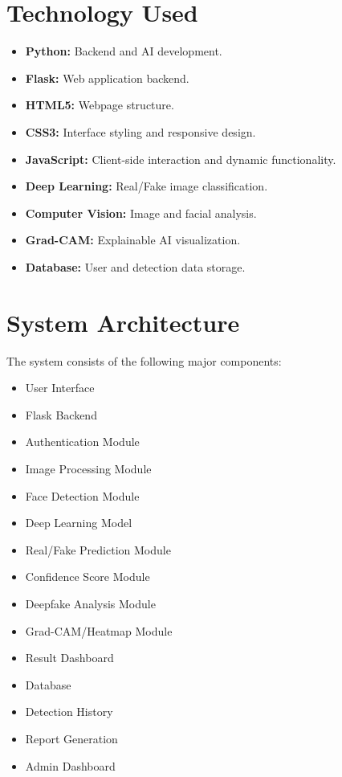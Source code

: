 \documentclass[12pt,a4paper,oneside]{report}
\begin{document}
\section{Technology Used}

\begin{itemize}
    \item \textbf{Python:} Backend and AI development.
    \item \textbf{Flask:} Web application backend.
    \item \textbf{HTML5:} Webpage structure.
    \item \textbf{CSS3:} Interface styling and responsive design.
    \item \textbf{JavaScript:} Client-side interaction and dynamic functionality.
    \item \textbf{Deep Learning:} Real/Fake image classification.
    \item \textbf{Computer Vision:} Image and facial analysis.
    \item \textbf{Grad-CAM:} Explainable AI visualization.
    \item \textbf{Database:} User and detection data storage.
\end{itemize}

\section{System Architecture}

The system consists of the following major components:

\begin{itemize}
    \item User Interface
    \item Flask Backend
    \item Authentication Module
    \item Image Processing Module
    \item Face Detection Module
    \item Deep Learning Model
    \item Real/Fake Prediction Module
    \item Confidence Score Module
    \item Deepfake Analysis Module
    \item Grad-CAM/Heatmap Module
    \item Result Dashboard
    \item Database
    \item Detection History
    \item Report Generation
    \item Admin Dashboard
\end{itemize}
\end{document}
